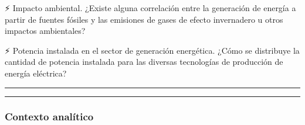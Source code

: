 \documentclass[11pt]{article}
\begin{document}
⚡ Impacto ambiental. ¿Existe alguna correlación entre la generación de
energía a partir de fuentes fósiles y las emisiones de gases de efecto
invernadero u otros impactos ambientales?

⚡ Potencia instalada en el sector de generación energética. ¿Cómo se
distribuye la cantidad de potencia instalada para las diversas
tecnologías de producción de energía eléctrica?

\begin{center}\rule{0.5\linewidth}{0.5pt}\end{center}

    \begin{center}\rule{0.5\linewidth}{0.5pt}\end{center}

\hypertarget{contexto-analuxedtico}{%
\subsubsection{Contexto analítico}\label{contexto-analuxedtico}}
\end{document}
